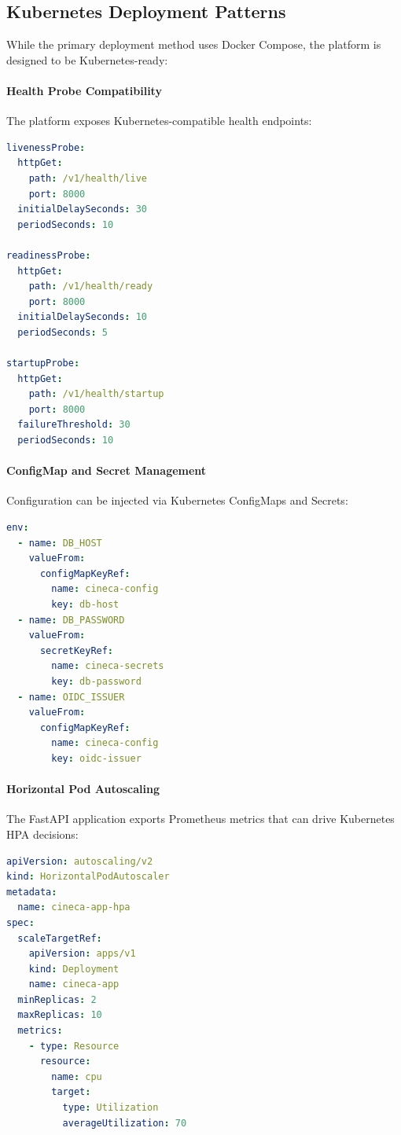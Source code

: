 \subsection{Kubernetes Deployment Patterns}

While the primary deployment method uses Docker Compose, the platform is designed to be Kubernetes-ready:

\paragraph{Health Probe Compatibility}
The platform exposes Kubernetes-compatible health endpoints:

\begin{lstlisting}[language=yaml, caption=Kubernetes probe configuration example]
livenessProbe:
  httpGet:
    path: /v1/health/live
    port: 8000
  initialDelaySeconds: 30
  periodSeconds: 10

readinessProbe:
  httpGet:
    path: /v1/health/ready
    port: 8000
  initialDelaySeconds: 10
  periodSeconds: 5

startupProbe:
  httpGet:
    path: /v1/health/startup
    port: 8000
  failureThreshold: 30
  periodSeconds: 10
\end{lstlisting}

\paragraph{ConfigMap and Secret Management}
Configuration can be injected via Kubernetes ConfigMaps and Secrets:

\begin{lstlisting}[language=yaml, caption=Kubernetes environment configuration example]
env:
  - name: DB_HOST
    valueFrom:
      configMapKeyRef:
        name: cineca-config
        key: db-host
  - name: DB_PASSWORD
    valueFrom:
      secretKeyRef:
        name: cineca-secrets
        key: db-password
  - name: OIDC_ISSUER
    valueFrom:
      configMapKeyRef:
        name: cineca-config
        key: oidc-issuer
\end{lstlisting}

\paragraph{Horizontal Pod Autoscaling}
The FastAPI application exports Prometheus metrics that can drive Kubernetes HPA decisions:

\begin{lstlisting}[language=yaml, caption=Horizontal Pod Autoscaler example]
apiVersion: autoscaling/v2
kind: HorizontalPodAutoscaler
metadata:
  name: cineca-app-hpa
spec:
  scaleTargetRef:
    apiVersion: apps/v1
    kind: Deployment
    name: cineca-app
  minReplicas: 2
  maxReplicas: 10
  metrics:
    - type: Resource
      resource:
        name: cpu
        target:
          type: Utilization
          averageUtilization: 70
\end{lstlisting}

